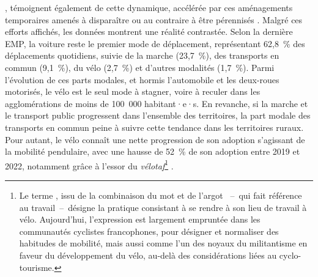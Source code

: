 \begin{refsegment}
{}, témoignent également de cette dynamique, accélérée par ces aménagements temporaires amenés à disparaître ou au contraire à être pérennisés \textcolor{blue}{\autocite[11]{chapelon_urbanisme_2023}}. Malgré ces efforts affichés, les données montrent une réalité contrastée. Selon la dernière \acrfull{EMP}, la voiture reste le premier mode de déplacement, représentant 62,8~\% des déplacements quotidiens, suivie de la marche (23,7~\%), des transports en commun (9,1~\%), du vélo (2,7~\%) et d'autres modalités (1,7~\%). Parmi l'évolution de ces parts modales, et hormis l'automobile et les deux-roues motorisés, le vélo est le seul mode à stagner, voire à reculer dans les agglomérations de moins de 100~000 habitant·e·s. En revanche, si la marche et le transport public progressent dans l'ensemble des territoires, la part modale des transports en commun peine à suivre cette tendance dans les territoires ruraux. Pour autant, le vélo connaît une nette progression de son adoption s'agissant de la mobilité pendulaire, avec une hausse de 52~\% de son adoption entre 2019 et 2022, notamment grâce à l'essor du \textsl{vélotaf}\footnote{
    Le terme , issu de la combinaison du mot  et de l'argot ~–~qui fait référence au travail~–~désigne la pratique consistant à se rendre à son lieu de travail à vélo. Aujourd'hui, l'expression est largement empruntée dans les communautés cyclistes francophones, pour désigner et normaliser des habitudes de mobilité, mais aussi comme l'un des noyaux du militantisme en faveur du développement du vélo, au-delà des considérations liées au cyclo-tourisme.
} \textcolor{blue}{\autocites{ipsos_enquete_2023}{le_point_pratique_2023}}.%


\end{refsegment}

